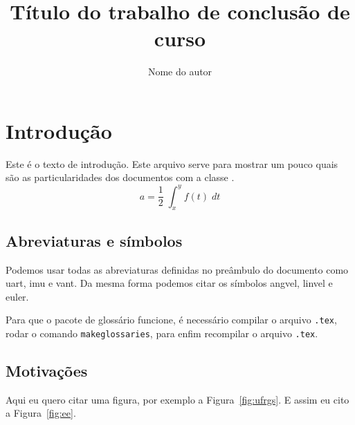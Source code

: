 \documentclass{automatex}
\title{Título do trabalho de conclusão de curso}
\author{Nome do autor}
\begin{document}
\maketitle %


\section{Introdução}

Este é o texto de introdução. Este arquivo serve para mostrar um pouco quais são as particularidades dos documentos com a classe \automatex.
\begin{equation}
  a = \dfrac{1}{2}\;\int_x^y f(t)\; dt
  \label{eq:eq1}
\end{equation}

\subsection{Abreviaturas e símbolos}

Podemos usar todas as abreviaturas definidas no preâmbulo do documento como \gls{uart}, \gls{imu} e \gls{vant}. Da mesma forma podemos citar os símbolos \gls{angvel}, \gls{linvel} e \gls{euler}.

Para que o pacote de glossário funcione, é necessário compilar o arquivo \verb+.tex+, rodar o comando \verb+makeglossaries+, para enfim recompilar o arquivo \verb+.tex+.

\subsection{Motivações}

Aqui eu quero citar uma figura, por exemplo a Figura~\ref{fig:ufrgs}.
E assim eu cito a Figura~\ref{fig:ee}.
\end{document}
